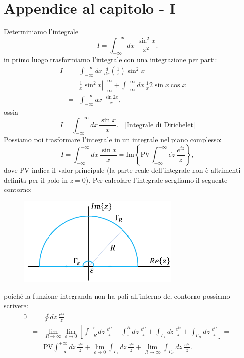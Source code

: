 \section*{Appendice al capitolo - I}
Determiniamo l'integrale
\begin{equation}
I= \int _{-\infty} ^{-\infty} dx\ \frac{\sin ^2 x}{x^2}.
\end{equation}
in primo luogo trasformiamo l'integrale con una integrazione per parti:
\begin{eqnarray}
I &=& \int _{-\infty} ^{-\infty} dx\ \frac{d}{dx}\left(\frac{1}{x}\right)\sin ^2 x = \nonumber \\
&=& \left. \frac{1}{x}\sin ^2 x\right\vert _{-\infty} ^{-\infty} +\int _{-\infty} ^{-\infty} dx\ \frac{1}{x} 2 \sin x \cos x =\\
&=& \int _{-\infty} ^{-\infty} dx\ \frac{\sin 2 x}{x}, \nonumber
\end{eqnarray}
ossia
\begin{equation}
I= \int _{-\infty} ^{-\infty} dx\ \frac{\sin  x}{x}. \quad \textrm{[Integrale di Dirichelet]}
\end{equation}
Possiamo poi trasformare l'integrale in un integrale nel piano complesso:
\begin{equation}
I= \int _{-\infty} ^{-\infty} dx\ \frac{\sin  x}{x}= \textrm{Im}\left\{\textrm{PV} \int _{-\infty} ^{-\infty} dz\ \frac{e^{iz}}{z}\right\},
\label{eq:cap15_14}
\end{equation}
dove PV indica il valor principale (la parte reale dell'integrale non è altrimenti definita per il polo in $z=0$). Per calcolare l'integrale scegliamo il seguente contorno:
\begin{figure}[!htbp]
\begin{center}
\includegraphics[width=8cm]{immagini/cap_15/fig_15_4.png}
\end{center}
\end{figure}
poiché la funzione integranda non ha poli all'interno del contorno possiamo scrivere:
\begin{eqnarray}
0 & = & \oint  dz\ \frac{e^{iz}}{z} = \nonumber \\
&=& \lim _{R\rightarrow \infty} \lim _{\varepsilon\rightarrow 0} \left[ \int _{-R} ^{-\varepsilon}dz\ \frac{e^{iz}}{z}+\int _{\varepsilon} ^{R}dz\ \frac{e^{iz}}{z}+\int _{\Gamma _{\varepsilon}} dz\ \frac{e^{iz}}{z} +\int _{\Gamma _{R}} dz\ \frac{e^{iz}}{z}\right] = \nonumber\\
&= &\textrm{PV}\int _{-\infty} ^{+\infty}dz\ \frac{e^{iz}}{z}+ \lim _{\varepsilon\rightarrow 0}  \int _{\Gamma _{\varepsilon}} dz\ \frac{e^{iz}}{z}+\lim _{R\rightarrow \infty}\int _{\Gamma _{R}} dz\ \frac{e^{iz}}{z}.
\label{eq:cap15_15}
\end{eqnarray}
